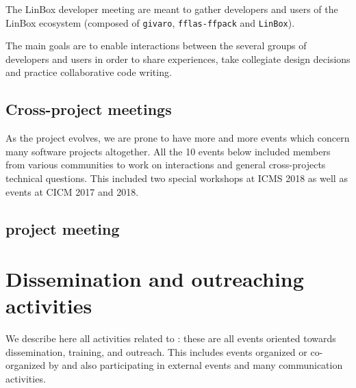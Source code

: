 \documentclass{deliverablereport}
\begin{document}
The LinBox developer meeting are meant to gather developers and users of the
LinBox ecosystem (composed of \texttt{givaro}, \texttt{fflas-ffpack} and
\texttt{LinBox}).

The main goals are to enable interactions between the several groups of
developers and users in order to share experiences, take collegiate design
decisions and practice collaborative code writing.





\subsection{Cross-project meetings}

As the project evolves, we are prone to have more and more events which 
concern many software projects altogether. All the 10 events below
included members from various communities to work on interactions and
general cross-projects technical questions. This included two special
workshops at ICMS 2018 as well as events at CICM 2017 and 2018.

















\subsection{\ODK project meeting}





\section{Dissemination and outreaching activities}

We describe here all activities related to :
these are all events oriented towards dissemination, training, and outreach. This
includes events organized or co-organized by \ODK and also
participating in external events and many communication activities.
\end{document}
